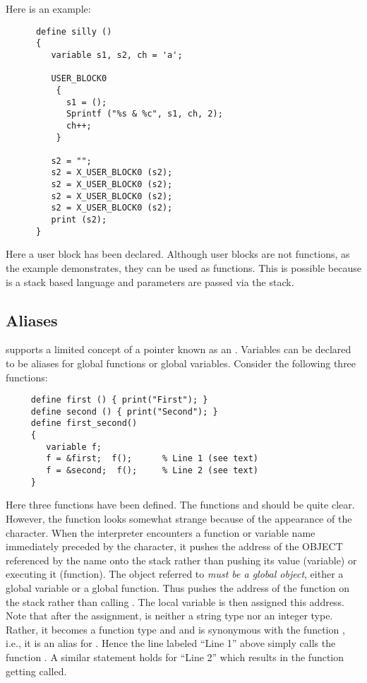    Here is an example:
\begin{verbatim}
      define silly ()
      {
         variable s1, s2, ch = 'a';
         
         USER_BLOCK0 
          {
            s1 = ();
            Sprintf ("%s & %c", s1, ch, 2);
            ch++;
          }
          
         s2 = "";
         s2 = X_USER_BLOCK0 (s2);
         s2 = X_USER_BLOCK0 (s2);
         s2 = X_USER_BLOCK0 (s2);
         s2 = X_USER_BLOCK0 (s2);
         print (s2);
      }
\end{verbatim}
   Here a user block has been declared.  Although user blocks are not
   functions, as the example demonstrates, they can be used as functions.
   This is possible because \slang{} is a stack based language and parameters
   are passed via the stack.
   
   
\subsection{Aliases}

   \slang{} supports a limited concept of a pointer known as an .
   Variables can be declared to be aliases for global functions or global
   variables. Consider the following three functions:
\begin{verbatim}
     define first () { print("First"); }
     define second () { print("Second"); }
     define first_second()
     {
        variable f;
        f = &first;  f();      % Line 1 (see text)
        f = &second;  f();     % Line 2 (see text)
     }
\end{verbatim}
   Here three functions have been defined.  The functions  and
    should be quite clear.  However, the function
    looks somewhat strange because of the appearance of
   the \var{\&} character. When the interpreter encounters a function or
   variable name immediately preceded by the \var{\&} character, it pushes
   the address of the OBJECT referenced by the name onto the stack rather
   than pushing its value (variable) or executing it (function).  The object
   referred to {\em must be a global object}, either a global variable or a
   global function. Thus  pushes the address of the function
    on the stack rather than calling . The local
   variable  is then assigned this address.  Note that after the
   assignment,  is neither a string type nor an integer type. Rather,
   it becomes a function type and and is synonymous with the function
   , i.e., it is an alias for . Hence the line labeled
   ``Line 1'' above simply calls the function . A similar
   statement holds for ``Line 2'' which results in the function 
   getting called.


